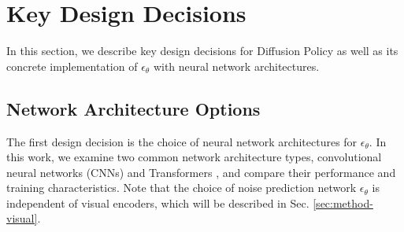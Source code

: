 \documentclass[Afour,sageh,times]{sagej}
\begin{document}
  
\section{Key Design Decisions}
 In this section, we describe key design decisions for Diffusion Policy as well as its concrete implementation of $\epsilon_\theta$ with neural network architectures.
 
\subsection{Network Architecture Options}
\label{sec:method-network}
The first design decision is the choice of neural network architectures for $\epsilon_\theta$. 
In this work, we examine two common network architecture types, convolutional neural networks (CNNs) \cite{ronneberger2015u} and Transformers \cite{vaswani2017attention}, and compare their performance and training characteristics. Note that the choice of noise prediction network $\epsilon_\theta$ is independent of visual encoders, which will be described in Sec. \ref{sec:method-visual}.
\end{document}
